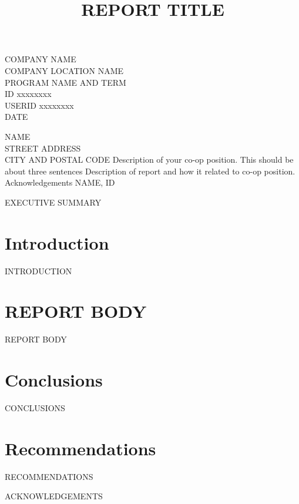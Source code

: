 \documentclass[12pt]{article}
\begin{document}
\title{REPORT TITLE}
{
	COMPANY NAME\\
	COMPANY LOCATION
}
{
	NAME\\
	PROGRAM NAME AND TERM\\
	ID xxxxxxxx\\
	USERID xxxxxxxx\\
	DATE
}


{
	\noindent
	NAME\\
	STREET ADDRESS\\
	CITY AND POSTAL CODE
}
{
	Description of your co-op position. This should be about three sentences
}
{
	Description of report and how it related to co-op position.
}
{
	Acknowledgements
}
{
	NAME, ID
}


EXECUTIVE SUMMARY
\newpage


\toc


\section{Introduction}
INTRODUCTION


\section{REPORT BODY}
REPORT BODY


\section{Conclusions}
CONCLUSIONS


\section{Recommendations}
RECOMMENDATIONS


\newpage



\newpage


ACKNOWLEDGEMENTS
\newpage


\end{document}
